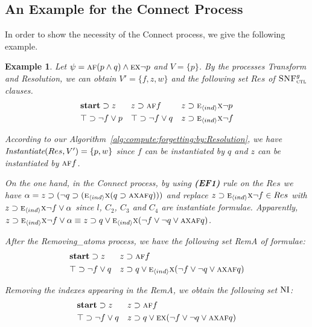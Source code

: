 \documentclass{article}
\newtheorem{example}{Example}
\begin{document}
\subsection{An Example for the Connect Process}
In order to show the necessity of the Connect process, we give the following example.
\begin{example}
Let $\psi=\textsc{a}\textsc{f}(p \wedge q) \wedge \textsc{e} \textsc{x} \neg p$ and $V=\{p\}$.
By the processes Transform and Resolution, we can obtain $V'=\{f,z,w\}$ and the following set $Res$ of ${\textsc{SNF}_{\textsc{ctl}}^g}$ clauses.
\begin{align*}
& \textbf{start} \supset z && z \supset \textsc{a}\textsc{f} f && z \supset  \textsc{e}_{{\langle{ind}\rangle}} \textsc{x} \neg p \\
& \top \supset \neg f \vee p && \top \supset \neg f \vee q && z \supset \textsc{e}_{{\langle{ind}\rangle}} \textsc{x} \neg f
\end{align*}

 According to our Algorithm~\ref{alg:compute:forgetting:by:Resolution}, we have $\emph{Instantiate}(Res,V')=\{p,w\}$ since $f$ can be instantiated by $q$ and $z$ can be instantiated by $\textsc{a}\textsc{f} f$.

On the one hand, in the \emph{Connect} process, by using \textbf{(EF1)} rule on the $Res$ we have $\alpha=z \supset (\neg q \supset  (\textsc{e}_{{\langle{ind}\rangle}}\textsc{x} (q \supset \textsc{a}\textsc{x} \textsc{a}\textsc{f} q )))$ and replace $z \supset \textsc{e}_{{\langle{ind}\rangle}} \textsc{x} \neg f \in Res$ with $z \supset \textsc{e}_{{\langle{ind}\rangle}} \textsc{x} \neg f \vee \alpha$ since $l$, $C_2$, $C_3$ and $C_4$ are instantiate formulae.
Apparently, $z \supset \textsc{e}_{{\langle{ind}\rangle}} \textsc{x} \neg f \vee \alpha \equiv z \supset q \vee \textsc{e}_{{\langle{ind}\rangle}} \textsc{x}(\neg f \vee \neg q \vee \textsc{a}\textsc{x} \textsc{a}\textsc{f} q)$.

After the \emph{Removing\_atoms} process, we have the following set \emph{RemA} of formulae:
\begin{align*}
& \textbf{start} \supset z && z \supset \textsc{a}\textsc{f} f \\
&  \top \supset \neg f \vee q && z \supset q \vee \textsc{e}_{{\langle{ind}\rangle}} \textsc{x}(\neg f \vee \neg q \vee \textsc{a}\textsc{x} \textsc{a}\textsc{f} q)
\end{align*}

Removing the indexes appearing in the \emph{RemA}, we obtain the following set $\textrm{NI}$:
 \begin{align*}
& \textbf{start} \supset z && z \supset \textsc{a}\textsc{f} f \\
&  \top \supset \neg f \vee q && z \supset q \vee \textsc{e} \textsc{x}(\neg f \vee \neg q \vee \textsc{a}\textsc{x} \textsc{a}\textsc{f} q)
\end{align*}


\end{example}
\end{document}
